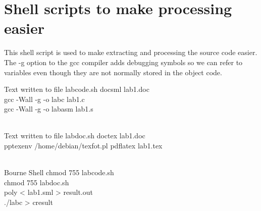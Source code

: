 \documentclass{article}
\begin{document}
\section*{Shell scripts to make processing easier}
This shell script is used to make extracting and processing the source code easier. The -g option to the gcc compiler adds debugging symbols so we can refer to variables even though they are not normally stored in the object code. 

\begin{GFT}{Text written to file labcode.sh}
\+docsml lab1.doc\\
\+gcc -Wall -g -o labc lab1.c\\
\+gcc -Wall -g -o labasm lab1.s\\
\+\\
\end{GFT}
\begin{GFT}{Text written to file labdoc.sh}
\+doctex lab1.doc\\
\+pptexenv /home/debian/texfot.pl pdflatex lab1.tex\\
\+\\
\end{GFT}
\begin{GFT}{Bourne Shell}
\+chmod 755 labcode.sh\\
\+chmod 755 labdoc.sh\\
\+poly < lab1.sml > result.out\\
\+./labc > cresult\\
\+\\
\end{GFT}
\end{document}
